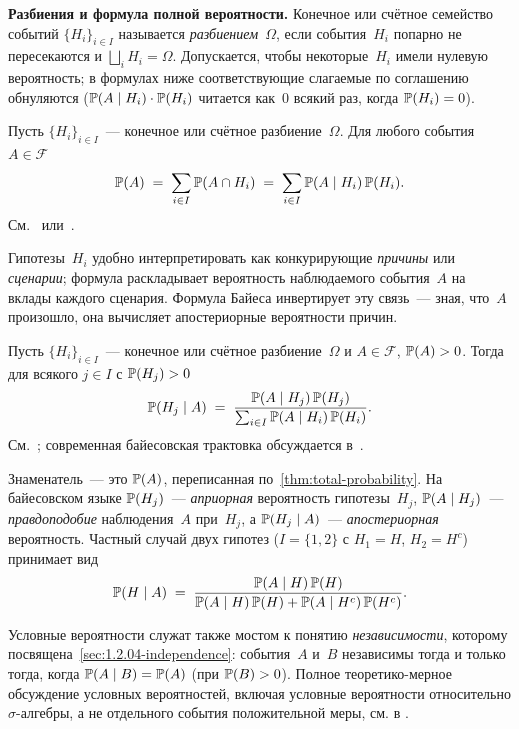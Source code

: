 \medskip
\noindent\textbf{Разбиения и формула полной вероятности.} Конечное или счётное семейство событий $\{H_i\}_{i \in I}$ называется \emph{разбиением}~$\Omega$, если события~$H_i$ попарно не пересекаются и $\bigsqcup_{i} H_i = \Omega$. Допускается, чтобы некоторые~$H_i$ имели нулевую вероятность; в формулах ниже соответствующие слагаемые по соглашению обнуляются ($\mathbb{P}(A \mid H_i) \cdot \mathbb{P}(H_i)$ читается как~$0$ всякий раз, когда $\mathbb{P}(H_i) = 0$).

\begin{theorem}
\label{thm:total-probability}
Пусть $\{H_i\}_{i \in I}$~--- конечное или счётное разбиение~$\Omega$. Для любого события $A \in \mathcal{F}$
\[
  \mathbb{P}(A) \;=\; \sum_{i \in I} \mathbb{P}(A \cap H_i) \;=\; \sum_{i \in I} \mathbb{P}(A \mid H_i)\, \mathbb{P}(H_i).
\]
См.~\cite[гл.~I, \S~3]{Shiryaev1989} или~\cite[гл.~I, \S~6]{Gnedenko2001}.
\end{theorem}

Гипотезы~$H_i$ удобно интерпретировать как конкурирующие \emph{причины} или \emph{сценарии}; формула раскладывает вероятность наблюдаемого события~$A$ на вклады каждого сценария. Формула Байеса инвертирует эту связь~--- зная, что~$A$ произошло, она вычисляет апостериорные вероятности причин.

\begin{theorem}[Байес]
\label{thm:bayes}
Пусть $\{H_i\}_{i \in I}$~--- конечное или счётное разбиение~$\Omega$ и $A \in \mathcal{F}$, $\mathbb{P}(A) > 0$. Тогда для всякого $j \in I$ с $\mathbb{P}(H_j) > 0$
\[
  \mathbb{P}(H_j \mid A) \;=\; \frac{\mathbb{P}(A \mid H_j)\, \mathbb{P}(H_j)}{\sum_{i \in I} \mathbb{P}(A \mid H_i)\, \mathbb{P}(H_i)}.
\]
См.~\cite[гл.~I, \S~3]{Shiryaev1989}; современная байесовская трактовка обсуждается в~\cite[гл.~I, \S~6]{Gnedenko2001}.
\end{theorem}

Знаменатель~--- это $\mathbb{P}(A)$, переписанная по~\cref{thm:total-probability}. На байесовском языке $\mathbb{P}(H_j)$~--- \emph{априорная} вероятность гипотезы~$H_j$, $\mathbb{P}(A \mid H_j)$~--- \emph{правдоподобие} наблюдения~$A$ при~$H_j$, а $\mathbb{P}(H_j \mid A)$~--- \emph{апостериорная} вероятность. Частный случай двух гипотез ($I = \{1, 2\}$ с $H_1 = H$, $H_2 = H^c$) принимает вид
\[
  \mathbb{P}(H \mid A) \;=\; \frac{\mathbb{P}(A \mid H)\, \mathbb{P}(H)}{\mathbb{P}(A \mid H)\, \mathbb{P}(H) + \mathbb{P}(A \mid H^c)\, \mathbb{P}(H^c)}.
\]

\begin{remark}
Условные вероятности служат также мостом к понятию \emph{независимости}, которому посвящена~\cref{sec:1.2.04-independence}: события~$A$ и~$B$ независимы тогда и только тогда, когда $\mathbb{P}(A \mid B) = \mathbb{P}(A)$ (при $\mathbb{P}(B) > 0$). Полное теоретико-мерное обсуждение условных вероятностей, включая условные вероятности относительно $\sigma$-алгебры, а не отдельного события положительной меры, см. в \cite[гл.~II, \S~7]{Shiryaev1989}.
\end{remark}

